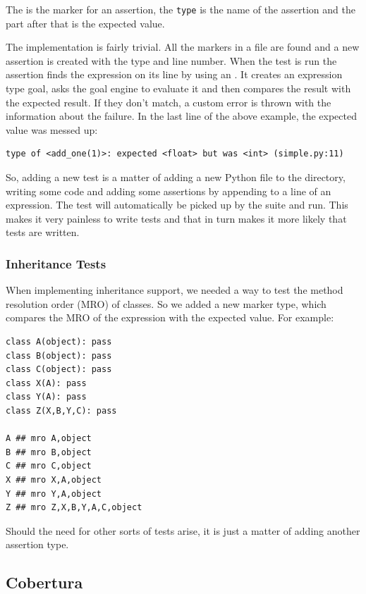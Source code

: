 \documentclass[12pt,halfparskip,DIV11,BCOR10mm]{scrreprt}
\begin{document}
The \code{##} is the marker for an assertion, the \texttt{type} is the name of the assertion and the part after that is the expected value.

The implementation is fairly trivial. All the markers in a file are found and a new assertion is created with the type and line number. When the test is run the assertion finds the expression on its line by using an . It creates an expression type goal, asks the goal engine to evaluate it and then compares the result with the expected result. If they don't match, a custom error  is thrown with the information about the failure. In the last line of the above example, the expected value was messed up:

\begin{verbatim}
type of <add_one(1)>: expected <float> but was <int> (simple.py:11)
\end{verbatim}

So, adding a new test is a matter of adding a new Python file to the directory, writing some code and adding some assertions by appending  to a line of an expression. The test will automatically be picked up by the suite and run. This makes it very painless to write tests and that in turn makes it more likely that tests are written.

\subsubsection{Inheritance Tests}

When implementing inheritance support, we needed a way to test the method resolution order (MRO) of classes. So we added a new marker type,  which compares the MRO of the expression with the expected value. For example:

\begin{lstlisting}
class A(object): pass
class B(object): pass
class C(object): pass
class X(A): pass
class Y(A): pass
class Z(X,B,Y,C): pass

A ## mro A,object
B ## mro B,object
C ## mro C,object
X ## mro X,A,object
Y ## mro Y,A,object
Z ## mro Z,X,B,Y,A,C,object
\end{lstlisting}

Should the need for other sorts of tests arise, it is just a matter of adding another assertion type.

\subsection{Cobertura}
\end{document}

